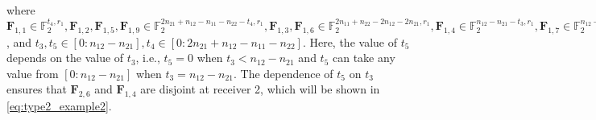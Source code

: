\documentclass[12pt, draftclsnofoot, onecolumn]{IEEEtran}
\theoremstyle{definition}
\begin{document}
where $\boldsymbol{F}_{1,1}\in\mathbb{F}_2^{t_4,r_1},\boldsymbol{F}_{1,2},\boldsymbol{F}_{1,5},\boldsymbol{F}_{1,9} \in \mathbb{F}_2^{2n_{21}+n_{12}-n_{11}-n_{22}-t_4,r_1},\boldsymbol{F}_{1,3},\boldsymbol{F}_{1,6} \in \mathbb{F}_2^{2n_{11}+n_{22}-2n_{12}-2n_{21},r_1} ,\boldsymbol{F}_{1,4}\in \mathbb{F}_2^{n_{12}-n_{21}-t_3,r_1},\boldsymbol{F}_{1,7} \in \mathbb{F}_2^{n_{12}-n_{21}-t_5,r_1},\boldsymbol{F}_{1,8}\in \mathbb{F}_2^{t_4,r_1},\boldsymbol{F}_{2,1} \in \mathbb{F}_2^{t_3,r_2},\boldsymbol{F}_{2,2},\boldsymbol{F}_{2,5},\boldsymbol{F}_{2,8}\in \mathbb{F}_2^{t_4,r_2},\boldsymbol{F}_{2,3},\boldsymbol{F}_{2,9} \in \mathbb{F}_2^{2n_{21}+n_{12}-n_{11}-n_{22}-t_4,r_2},\boldsymbol{F}_{2,4},\boldsymbol{F}_{2,7}\in \mathbb{F}_2^{2n_{22}+n_{11}-2n_{12}-2n_{21},r_2},\boldsymbol{F}_{2,6} \in \mathbb{F}_2^{t_5,r_2}$, and $t_3,t_5\in [0:n_{12}-n_{21}],t_4 \in [0:2n_{21}+n_{12}-n_{11}-n_{22}]$. Here, the value of $t_5$ depends on the value of $t_3$, i.e., $t_5 = 0$ when $t_3<n_{12}-n_{21}$ and $t_5$ can take any value from $[0:n_{12}-n_{21}]$ when $t_3=n_{12}-n_{21}$. The dependence of $t_5$ on $t_3$ ensures that $\boldsymbol{F}_{2,6}$ and $\boldsymbol{F}_{1,4}$ are disjoint at receiver 2, which will be shown in \eqref{eq:type2_example2}.
\end{document}
